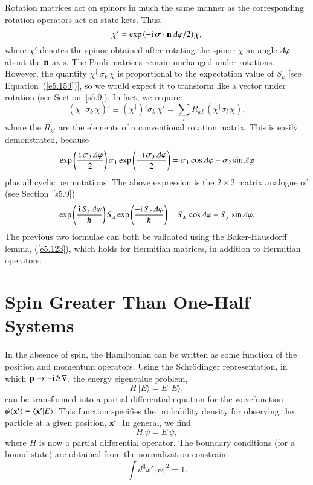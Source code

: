 Rotation matrices act on spinors in much the same manner as the corresponding
rotation operators act on state kets. Thus,
\begin{equation}
\chi' = \exp\left(-{\rm i} \,\bsigma\cdot{\bf n}\,{\mit\Delta}\varphi/2\right) \chi,
\end{equation}
where $\chi'$ denotes the  spinor  obtained after rotating the spinor
$\chi$ an angle ${\mit\Delta}\varphi$ about the ${\bf n}$-axis. 
The Pauli matrices remain unchanged under rotations. 
However, the quantity $\chi^\dagger \,\sigma_k \,\chi$ is proportional to the expectation
value of $S_k$ [see Equation~(\ref{e5.159})], so we would expect it to transform like a
vector under rotation (see Section~\ref{s5.9}). In fact, we
require
\begin{equation}
(\chi^\dagger \,\sigma_k \,\chi)' \equiv (\chi^\dagger)' \sigma_k\, \chi' = \sum_l R_{k\,l}\,
(\chi^\dagger \sigma_l\, \chi),
\end{equation}
where the $R_{kl}$ are the elements of a conventional rotation matrix. This
is easily demonstrated, because
\begin{equation}
\exp\left(\frac{\,{\rm i}\,\sigma_3 \,{\mit\Delta}\varphi}{2}\right) \sigma_1 \exp\left(
\frac{-{\rm i}\,\sigma_3 \,{\mit\Delta}\varphi}{2}\right) = \sigma_1 \cos{\mit\Delta}\varphi
-\sigma_2 \sin{\mit\Delta}\varphi
\end{equation}
plus all cyclic permutations. The above expression is the $2\times 2$ matrix analogue
of (see Section~\ref{s5.9})
\begin{equation}
\exp\left(\frac{\,{\rm i}\,S_z \,{\mit\Delta}\varphi}{\hbar}\right) S_x \exp\left(
\frac{-{\rm i}\,S_z \,{\mit\Delta}\varphi}{\hbar}\right) = S_x\,  \cos{\mit\Delta}\varphi
-S_y\, \sin{\mit\Delta}\varphi.
\end{equation}
The previous two formulae can both be validated using the Baker-Hausdorff lemma,
(\ref{e5.123}), which holds for Hermitian matrices, in addition to Hermitian operators. 

\section{Spin Greater Than One-Half Systems}
In the absence of spin, the Hamiltonian can be written as some function
of the position and momentum operators. Using the Schr\"{o}dinger representation,
in which ${\bf p} \rightarrow -{\rm i}\,\hbar\,\nabla$, the energy eigenvalue
problem,
\begin{equation}
H\,|E\rangle = E\,|E\rangle,
\end{equation}
can be transformed into a partial differential equation for the wavefunction
$\psi({\bf x}') \equiv \langle {\bf x'}|E\rangle$. This function specifies the
probability density for observing the particle at a given position, ${\bf x}'$. 
In general, we find
\begin{equation}
H \,\psi = E\, \psi,
\end{equation}
where $H$ is now a partial differential operator.
 The boundary conditions (for a bound state) are obtained
 from the normalization constraint
\begin{equation}
\int d^3x'\, |\psi|^{\,2}= 1.
\end{equation}

